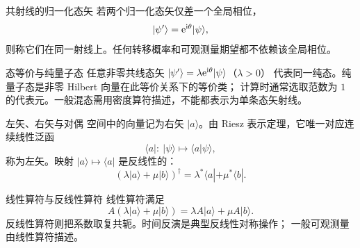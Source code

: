 \begin{advdefinition}{共射线的归一化态矢}\label{advA6:def:same-ray}
若两个归一化态矢仅差一个全局相位，
\[
 |\psi'\rangle=\mathrm e^{\mathrm i\theta}|\psi\rangle,
\]
则称它们在同一射线上。任何转移概率和可观测量期望都不依赖该全局相位。
\end{advdefinition}

\begin{advdefinition}{态等价与纯量子态}\label{advA6:def:state-equivalence}
任意非零共线态矢
$|\psi'\rangle=\lambda\mathrm e^{\mathrm i\theta}|\psi\rangle$（$\lambda>0$）
代表同一纯态。纯量子态是非零 Hilbert 向量在此等价关系下的等价类；
计算时通常选取范数为 $1$ 的代表元。一般混态需用密度算符描述，不能都表示为单条态矢射线。
\end{advdefinition}

\begin{advdefinition}{左矢、右矢与对偶}\label{advA6:def:bra-ket}
空间中的向量记为右矢 $|a\rangle$。由 Riesz 表示定理，它唯一对应连续线性泛函
\[
 \langle a|:\ |\psi\rangle\mapsto\langle a|\psi\rangle,
\]
称为左矢。映射 $|a\rangle\mapsto\langle a|$ 是反线性的：
\[
 (\lambda|a\rangle+\mu|b\rangle)^\dagger
 =\lambda^*\langle a|+\mu^*\langle b|.
\]
\end{advdefinition}

\begin{advdefinition}{线性算符与反线性算符}\label{advA6:def:operator}
线性算符满足
\[
 A(\lambda|a\rangle+\mu|b\rangle)
 =\lambda A|a\rangle+\mu A|b\rangle.
\]
反线性算符则把系数取复共轭。时间反演是典型反线性对称操作；
一般可观测量由线性算符描述。
\end{advdefinition}

